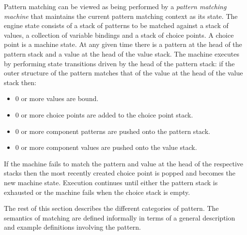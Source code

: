 \documentclass{article}
\begin{document}
Pattern matching can be viewed as being performed by a {\em pattern matching
machine} that maintains the current pattern matching context as its state. 
The engine state consists of a stack of patterns to be matched against a 
stack of values, a collection of variable bindings and a stack of choice points.
A choice point is a machine state. At any given time there is a pattern at
the head of the pattern stack and a value at the head of the value stack.
The machine executes by performing state transitions driven by the head of
the pattern stack: if the outer structure of the pattern matches that of the
value at the head of the value stack then:
\begin{itemize}
\item 0 or more values are bound.
\item 0 or more choice points are added to the choice point stack.
\item 0 or more component patterns are pushed onto the pattern stack.
\item 0 or more component values are pushed onto the value stack.
\end{itemize}
If the machine fails to match the pattern and value at the head of the 
respective stacks then the most recently created choice point is popped
and becomes the new machine state.
Execution continues until either the pattern stack is exhausted or the
machine fails when the choice stack is empty.

The rest of this section describes the different categories of pattern.
The semantics of matching are defined informally in terms of a general
description and example definitions involving the pattern.
\end{document}

